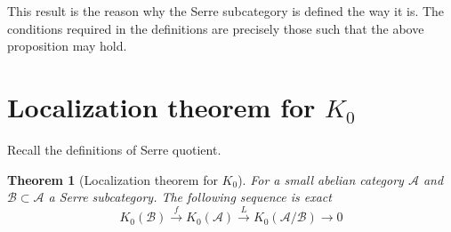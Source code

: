 \documentclass[12pt]{report}
\numberwithin{equation}{section}
\newtheorem{theorem}[dummy]{Theorem}
\begin{document}
	This result is the reason why the Serre subcategory is defined the way it is. The conditions required in the definitions are precisely those such that the above proposition may hold.
	
	
	
	
	\section{Localization theorem for $K_0$}\label{Localizationk0}
	Recall the definitions of Serre quotient.
	\begin{theorem}[Localization theorem for $K_0$]
		For a small abelian category $\mathcal{A}$ and $\mathcal{B} \subset \mathcal{A}$ a Serre subcategory. The following sequence is exact
		\[ K_0(\mathcal{B}) \xrightarrow{f} K_0(\mathcal{A}) \xrightarrow{L} K_0(\mathcal{A/B}) \to 0 \]
	\end{theorem}
\end{document}
